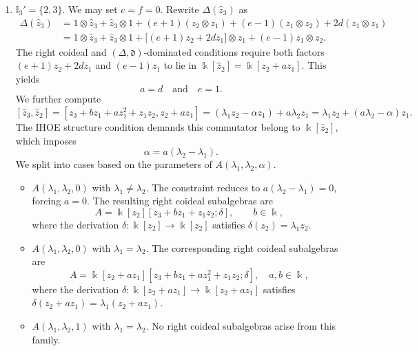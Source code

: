 \documentclass{article}
\theoremstyle{plain}
\theoremstyle{definition}
\numberwithin{equation}{section}
\newcommand{\II}{\mathbb{I}}
\newcommand{\dd}{\mathfrak{d}}
\begin{document}
\begin{enumerate}
		\item $\II_{3}'=\{2,3\}$. We may set $c=f=0$. Rewrite $\Delta(\hat z_{3})$ as
		\[
		\begin{aligned}
			\Delta(\hat z_{3})
			&=1\otimes\hat z_{3}+\hat z_{3}\otimes1+ (e+1)(z_{2}\otimes z_{1})+(e-1)(z_{1}\otimes z_{2})
			+2d(z_{1}\otimes z_{1}) \\
			&= 1\otimes\hat z_{3}+\hat z_{3}\otimes1+\bigl[(e+1)z_{2}+2d z_{1}\bigr]\otimes z_{1}
			+  (e-1)z_{1}\otimes z_{2}.
		\end{aligned}
		\]
		The right coideal and $(\Delta,\dd)$-dominated conditions require both factors $(e+1)z_{2}+2d z_{1}$ and $(e-1)z_{1}$ to lie in
		$\Bbbk[\hat z_{2}]=\Bbbk[z_{2}+a z_{1}]$. This yields
		\[
		a=d \quad \text{and}\quad e=1.
		\]
		We further compute
		\[
		[\hat z_{3},\hat z_{2}] =[z_{3}+bz_{1}+az_{1}^{2} +z_{1}z_{2}, z_{2}+az_{1}]
		= (\lambda_{1} z_{2} - \alpha z_{1}) + a\lambda_{2} z_{1}
		= \lambda_{1} z_{2} + (a\lambda_{2}-\alpha)z_{1}.
		\]
		The IHOE structure condition demands this commutator belong to
		$\Bbbk[\hat z_{2}]$, which imposes
		\[
		\alpha = a(\lambda_{2}-\lambda_{1}).
		\]
		We split into cases based on the parameters of $A(\lambda_{1},\lambda_{2},\alpha)$.
		\begin{itemize}
			\item $A(\lambda_{1},\lambda_{2},0)$ with $\lambda_{1} \neq \lambda_{2}$. The constraint reduces to $a(\lambda_{2}-\lambda_{1})=0$, forcing $a=0$. The resulting right coideal subalgebras are
			\[
			A=\Bbbk[z_{2}][z_{3}+bz_{1}+z_{1}z_{2};\delta], \qquad b\in\Bbbk,
			\]
			where the derivation $\delta\colon\Bbbk[z_{2}]\rightarrow \Bbbk[z_{2}]$ satisfies $\delta(z_{2})=\lambda_{1}z_{2}$.
			\item $A(\lambda_{1},\lambda_{2},0)$ with $\lambda_{1} =\lambda_{2}$. The corresponding right coideal subalgebras are
			\[
			A=\Bbbk[z_{2}+az_{1}][z_{3}+bz_{1}+az_{1}^{2}+z_{1}z_{2};\delta], \quad a,b \in \Bbbk,
			\]
			where the derivation $\delta\colon\Bbbk[z_{2}+az_{1}]\rightarrow \Bbbk[z_{2}+az_{1}]$ satisfies $\delta(z_{2}+az_{1})=\lambda_{1}(z_{2}+az_{1})$.
			\item $A(\lambda_{1},\lambda_{2},1)$ with $\lambda_{1} = \lambda_{2}$. No right coideal subalgebras arise from this family.
		\end{itemize}
	\end{enumerate}
	
\end{document}
